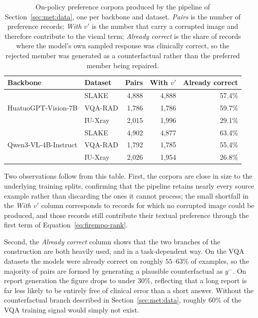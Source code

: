 \begin{table}[ht]
\centering
\small
\caption{On-policy preference corpora produced by the pipeline of Section~\ref{sec:met:data}, one per backbone and dataset. \emph{Pairs} is the number of preference records; \emph{With $v'$} is the number that carry a corrupted image and therefore contribute to the visual term; \emph{Already correct} is the share of records where the model's own sampled response was clinically correct, so the rejected member was generated as a counterfactual rather than the preferred member being repaired.}
\label{tab:corpus}
\begin{tabular}{llrrr}
\toprule
\textbf{Backbone} & \textbf{Dataset} & \textbf{Pairs} & \textbf{With $v'$} & \textbf{Already correct} \\
\midrule
\multirow{3}{*}{HuatuoGPT-Vision-7B}
 & SLAKE   & 4{,}888 & 4{,}888 & 57.4\% \\
 & VQA-RAD & 1{,}786 & 1{,}786 & 59.7\% \\
 & IU-Xray & 2{,}015 & 1{,}996 & 29.1\% \\
\midrule
\multirow{3}{*}{Qwen3-VL-4B-Instruct}
 & SLAKE   & 4{,}902 & 4{,}877 & 63.4\% \\
 & VQA-RAD & 1{,}792 & 1{,}785 & 55.4\% \\
 & IU-Xray & 2{,}026 & 1{,}954 & 26.8\% \\
\bottomrule
\end{tabular}
\end{table}

Two observations follow from this table. First, the corpora are close in size to the underlying training splits, confirming that the pipeline retains nearly every source example rather than discarding the ones it cannot process; the small shortfall in the \emph{With $v'$} column corresponds to records for which no corrupted image could be produced, and those records still contribute their textual preference through the first term of Equation~\ref{eq:firempo-rank}.

Second, the \emph{Already correct} column shows that the two branches of the construction are both heavily used, and in a task-dependent way. On the VQA datasets the models were already correct on roughly $55$--$63\%$ of examples, so the majority of pairs are formed by generating a plausible counterfactual as $y^-$. On report generation the figure drops to under $30\%$, reflecting that a long report is far less likely to be entirely free of clinical error than a short answer. Without the counterfactual branch described in Section~\ref{sec:met:data}, roughly $60\%$ of the VQA training signal would simply not exist.

